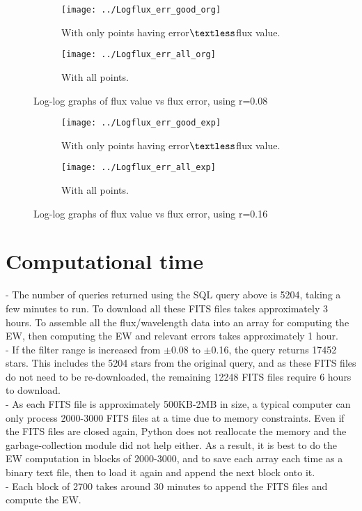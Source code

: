 \documentclass[12pt]{article}
\begin{document}
\begin{figure}
\begin{subfigure}{.5\textwidth}
\texttt{[image: ../Logflux\_err\_good\_org]}
\caption{With only points having error$\textless$flux value.}
\end{subfigure}
\begin{subfigure}{.4\textwidth}
\texttt{[image: ../Logflux\_err\_all\_org]}
\caption{With all points.}
\end{subfigure}
\caption{Log-log graphs of flux value vs flux error, using r=0.08}
\end{figure}
\begin{figure}
\begin{subfigure}{.5\textwidth}
\texttt{[image: ../Logflux\_err\_good\_exp]}
\caption{With only points having error$\textless$flux value.}
\end{subfigure}
\begin{subfigure}{.4\textwidth}
\texttt{[image: ../Logflux\_err\_all\_exp]}
\caption{With all points.}
\end{subfigure}
\caption{Log-log graphs of flux value vs flux error, using r=0.16}
\end{figure}


\section{Computational time}
- The number of queries returned using the SQL query above is 5204, taking a few minutes to run. To download all these FITS files takes approximately 3 hours. To assemble all the flux/wavelength data into an array for computing the EW, then computing the EW and relevant errors takes approximately 1 hour. \\
- If the filter range is increased from $\pm$0.08 to $\pm$0.16, the query returns 17452 stars. This includes the 5204 stars from the original query, and as these FITS files do not need to be re-downloaded, the remaining 12248 FITS files require 6 hours to download.\\
- As each FITS file is approximately 500KB-2MB in size, a typical computer can only process 2000-3000 FITS files at a time due to memory constraints. Even if the FITS files are closed again, Python does not reallocate the memory and the garbage-collection module did not help either. As a result, it is best to do the EW computation in blocks of 2000-3000, and to save each array each time as a binary text file, then to load it again and append the next block onto it.\\
- Each block of 2700 takes around 30 minutes to append the FITS files and compute the EW.
\end{document}

